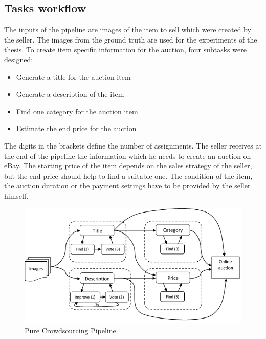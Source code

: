 \subsection{Tasks workflow}
The inputs of the pipeline are images of the item to sell which were created by the seller. The images from the ground truth are used for the experiments of the thesis. To create item specific information for the auction, four subtasks were designed: 
\begin{itemize}
	\item Generate a title for the auction item
	\item Generate a description of the item
	\item Find one category for the auction item  
	\item Estimate the end price for the auction  
\end{itemize}
The digits in the brackets define the number of assignments. The seller receives at the end of the pipeline the information which he needs to create an auction on eBay. The starting price of the item depends on the sales strategy of the seller, but the end price should help to find a suitable one. The condition of the item, the auction duration or the payment settings have to be provided by the seller himself.
\begin{figure}[h!]
\centering
\includegraphics[scale=0.8]{images/pipelines/Pure_Pipeline.png}
\caption{Pure Crowdsourcing Pipeline}
\label{purePipeline}
\end{figure}

